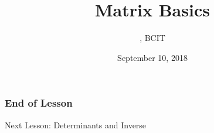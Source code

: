 \documentclass[xcolor=dvipsnames]{beamer}
\title{Matrix Basics}
\subtitle{{\CourseNumber}, BCIT}
\author{\CourseName}
\date{September 10, 2018}
\begin{document}
\begin{frame}
  \titlepage
\end{frame}

\begin{frame}
  \frametitle{End of Lesson}
Next Lesson: Determinants and Inverse
\end{frame}
\end{document}
